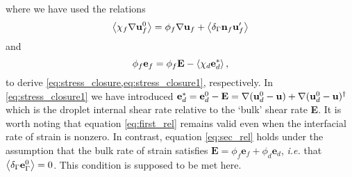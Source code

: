 where we have used the relations 
\begin{equation}
    \avg{\chi_f \grad \textbf{u}_f^0}
    = 
    \phi_f \grad  \textbf{u}_f
    + \avg{\delta_\Gamma \textbf{n}_f \textbf{u}_f'}
    \label{eq:first_rel}
\end{equation}
and
\begin{equation}
\phi _f\textbf{e}_f
    = 
    \phi_f \textbf{E}
    - \avg{\chi_d \textbf{e}_d^*},
    \label{eq:sec_rel}
\end{equation}
to derive \ref{eq:stress_closure,eq:stress_closure1}, respectively. 
In \ref{eq:stress_closure1} we have introduced $\textbf{e}_d^* = \textbf{e}_d^0 - \textbf{E} = \mathbf{\nabla} (\textbf{u}_d^0-\textbf{u})+\mathbf{\nabla} (\textbf{u}_d^0-\textbf{u})^\dagger$ which is the droplet internal shear rate relative to the `bulk' shear rate \textbf{E}.
It is worth noting that equation \ref{eq:first_rel} remains valid even when the interfacial rate of strain is nonzero. 
In contrast, equation \ref{eq:sec_rel} holds under the assumption that the bulk rate of strain satisfies $\textbf{E} = \phi_f \textbf{e}_f + \phi_d \textbf{e}_d$, \textit{i.e.} that $\left<\delta_\Gamma \textbf{e}_\Gamma^0\right> = 0$. 
This condition is supposed to be met here.

